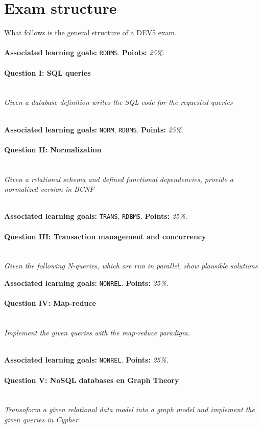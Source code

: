 \section*{Exam structure}
What follows is the general structure of a DEV5 exam.
\\ 
\\
\textbf{Associated learning goals:} \texttt{RDBMS}.
\textbf{Points:} \textit{25\%.}
\paragraph{Question I: SQL queries} \ \\

\textit{Given a database definition writes the SQL code for the requested queries} 


\ \\ 
\textbf{Associated learning goals:} \texttt{NORM}, \texttt{RDBMS}.
\textbf{Points:} \textit{25\%.}
\paragraph{Question II: Normalization} \ \\ 

\textit{Given a relational schema and defined functional dependencies, provide a normalized version in BCNF}

\ \\ 

\textbf{Associated learning goals:} \texttt{TRANS}, \texttt{RDBMS}.
\textbf{Points:} \textit{25\%.}
\paragraph{Question III: Transaction management and concurrency}

\ \\ 

\textit{Given the following N-queries, which are run in parallel, show plausible solutions }


\textbf{Associated learning goals:} \texttt{NONREL}.
\textbf{Points:} \textit{25\%.}
\paragraph{Question IV: Map-reduce}

\ \\ 

\textit{Implement the given queries with the map-reduce paradigm.}

\ \\ 
\textbf{Associated learning goals:} \texttt{NONREL}.
\textbf{Points:} \textit{25\%.}
\paragraph{Question V: NoSQL databases en Graph Theory}

\ \\ 

\textit{Transoform a given relational data model into a graph model and implement the given queries in Cypher}